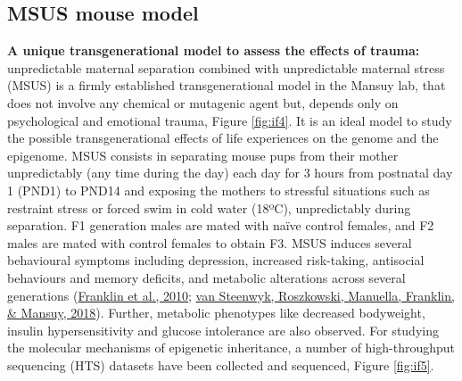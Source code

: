 \documentclass[12pt,twoside]{reedthesis}
\begin{document}
\hypertarget{msus-mouse-model}{%
\subsection*{MSUS mouse model}\label{msus-mouse-model}}

\textbf{A unique transgenerational model to assess the effects of trauma:}
unpredictable maternal separation combined with unpredictable maternal
stress (MSUS) is a firmly established transgenerational model in the
Mansuy lab, that does not involve any chemical or mutagenic agent but,
depends only on psychological and emotional trauma, Figure \ref{fig:if4}. It is an
ideal model to study the possible transgenerational effects of life
experiences on the genome and the epigenome. MSUS consists in separating
mouse pups from their mother unpredictably (any time during the day)
each day for 3 hours from postnatal day 1 (PND1) to PND14 and exposing the mothers to stressful situations such as restraint stress or
forced swim in cold water (18ºC), unpredictably during separation. F1 generation males are mated with naïve control females, and F2
males are mated with control females to obtain F3. MSUS induces several
behavioural symptoms including depression, increased risk-taking,
antisocial behaviours and memory deficits, and metabolic alterations
across several generations (\protect\hyperlink{ref-franklin2010}{Franklin et al., 2010}; \protect\hyperlink{ref-vansteenwyk2018}{van Steenwyk, Roszkowski, Manuella, Franklin, \& Mansuy, 2018}). Further,
metabolic phenotypes like decreased bodyweight, insulin hypersensitivity
and glucose intolerance are also observed. For studying the molecular
mechanisms of epigenetic inheritance, a number of high-throughput sequencing (HTS) datasets have been
collected and sequenced, Figure \ref{fig:if5}.
\end{document}

